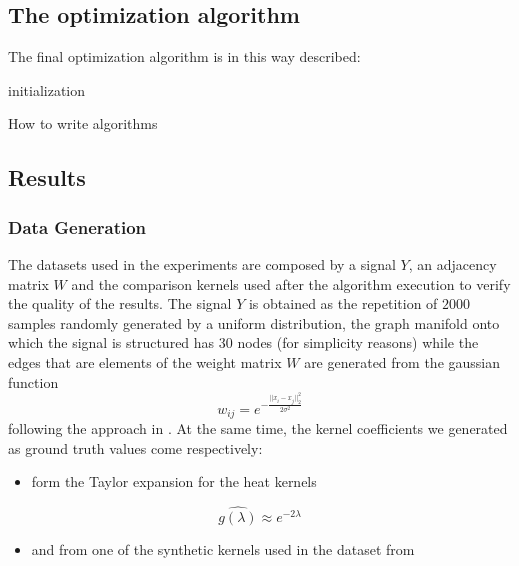 \subsection{The optimization algorithm}
The final optimization algorithm is in this way described:
\begin{algorithm}[H]
 initialization\;
 \caption{How to write algorithms}
\end{algorithm}

\subsection{Results}
\subsubsection{Data Generation}
The datasets used in the experiments are composed by a signal $Y$, an adjacency matrix $W$ and the comparison kernels used after the algorithm execution to verify the quality of the results. The signal $Y$ is obtained as the repetition of $2000$ samples randomly generated by a uniform distribution, the graph manifold onto which the signal is structured has $30$ nodes (for simplicity reasons) while the edges that are elements of the weight matrix $W$ are generated from the gaussian function
\begin{equation}
w_{ij} = e^{-\frac{||x_i - x_j||_2^2}{2\sigma^2}}
\end{equation}
following the approach in \cite{Kalofolias2016}. At the same time, the kernel coefficients we generated as ground truth values come respectively:
\begin{itemize}
\item form the Taylor expansion for the heat kernels
\end{itemize}
\begin{equation}
\hat{g(\lambda)} \approx e^{-2\lambda}
\end{equation}
\begin{itemize}
\item and from one of the synthetic kernels used in the dataset from \cite{Thanou2014}
\end{itemize}

